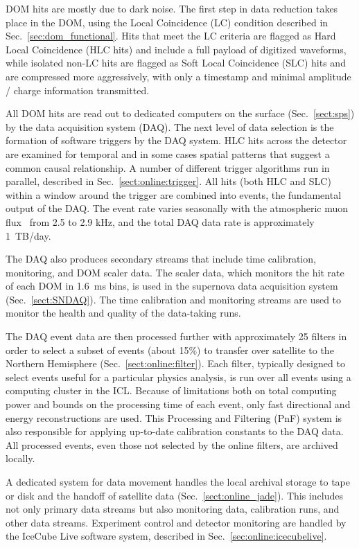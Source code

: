 DOM hits are mostly due to dark noise. The first step
in data reduction takes place in the DOM, using the Local Coincidence (LC) condition described in
Sec.~\ref{sec:dom_functional}.  Hits that meet the LC criteria are flagged
as Hard Local Coincidence (HLC hits) and include a full payload of
digitized waveforms, while isolated non-LC hits are flagged as Soft Local
Coincidence (SLC) hits and are compressed more aggressively, with only a
timestamp and minimal amplitude / charge information transmitted.

All DOM hits are read out to dedicated computers on the surface
(Sec.~\ref{sect:sps}) by the data acquisition system (DAQ).  The next level
of data selection is the formation of software triggers by the DAQ
system. HLC hits across the detector are examined 
for temporal and in some cases spatial patterns that suggest a common
causal relationship.  A number of different trigger algorithms run in
parallel, described in Sec.~\ref{sect:online:trigger}.  All hits (both HLC
and SLC) within a window around the trigger are combined into events, the
fundamental output of the DAQ.  The event rate varies
seasonally with the atmospheric muon flux~\cite{ICECUBE:IceTop} from 2.5 to 2.9 kHz,
and the total DAQ data rate is approximately 1~TB/day.

The DAQ also produces secondary streams that include time calibration,
monitoring, and DOM scaler data.  The scaler data, which monitors the
hit rate of each DOM in 1.6~ms bins, is used in the supernova data
acquisition system (Sec.~\ref{sect:SNDAQ}).  The time calibration and
monitoring streams are used to monitor the health and quality of the
data-taking runs.

The DAQ event data are then processed further with approximately 25 filters
in order to select a subset of events (about 15\%) to transfer over
satellite to the Northern Hemisphere (Sec.~\ref{sect:online:filter}).  Each
filter, typically designed to select events useful for a particular physics
analysis, is run over all events using a computing cluster in the ICL.
Because of limitations both on total computing power and bounds on the
processing time of each event, only fast directional and energy
reconstructions are used.  This Processing and Filtering (PnF) system is
also responsible for applying up-to-date calibration constants to the DAQ
data. All processed events, even those not selected by the online filters,
are archived locally.

A dedicated system for data movement handles the local archival storage to
tape or disk and the handoff of satellite data
(Sec.~\ref{sect:online_jade}).  This includes not only primary data streams
but also monitoring data, calibration runs, and other data streams.
Experiment control and detector monitoring are handled by the IceCube Live
software system, described in Sec.~\ref{sec:online:icecubelive}.

